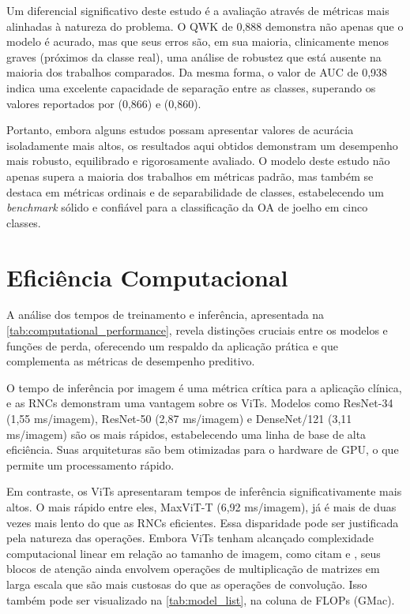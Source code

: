 Um diferencial significativo deste estudo é a avaliação através de métricas mais alinhadas à natureza do problema. O QWK de 0,888 demonstra não apenas que o modelo é acurado, mas que seus erros são, em sua maioria, clinicamente menos graves (próximos da classe real), uma análise de robustez que está ausente na maioria dos trabalhos comparados. Da mesma forma, o valor de AUC de 0,938 indica uma excelente capacidade de separação entre as classes, superando os valores reportados por \cite{domingues2023} (0,866) e \cite{apon2024} (0,860).

Portanto, embora alguns estudos possam apresentar valores de acurácia isoladamente mais altos, os resultados aqui obtidos demonstram um desempenho mais robusto, equilibrado e rigorosamente avaliado. O modelo deste estudo não apenas supera a maioria dos trabalhos em métricas padrão, mas também se destaca em métricas ordinais e de separabilidade de classes, estabelecendo um \textit{benchmark} sólido e confiável para a classificação da OA de joelho em cinco classes.

\section{Eficiência Computacional}

A análise dos tempos de treinamento e inferência, apresentada na \autoref{tab:computational_performance}, revela distinções cruciais entre os modelos e funções de perda, oferecendo um respaldo da aplicação prática e que complementa as métricas de desempenho preditivo.

O tempo de inferência por imagem é uma métrica crítica para a aplicação clínica, e as RNCs demonstram uma vantagem sobre os ViTs. Modelos como ResNet-34 (1,55 ms/imagem), ResNet-50 (2,87 ms/imagem) e DenseNet/121 (3,11 ms/imagem) são os mais rápidos, estabelecendo uma linha de base de alta eficiência. Suas arquiteturas são bem otimizadas para o hardware de GPU, o que permite um processamento rápido.

Em contraste, os ViTs apresentaram tempos de inferência significativamente mais altos. O mais rápido entre eles, MaxViT-T (6,92 ms/imagem), já é mais de duas vezes mais lento do que as RNCs eficientes. Essa disparidade pode ser justificada pela natureza das operações. Embora ViTs tenham alcançado complexidade computacional linear em relação ao tamanho de imagem, como citam \cite{ding2022davitdualattentionvision} e \cite{maxvit2022}, seus blocos de atenção ainda envolvem operações de multiplicação de matrizes em larga escala que são mais custosas do que as operações de convolução. Isso também pode ser visualizado na \autoref{tab:model_list}, na coluna de FLOPs (GMac).

